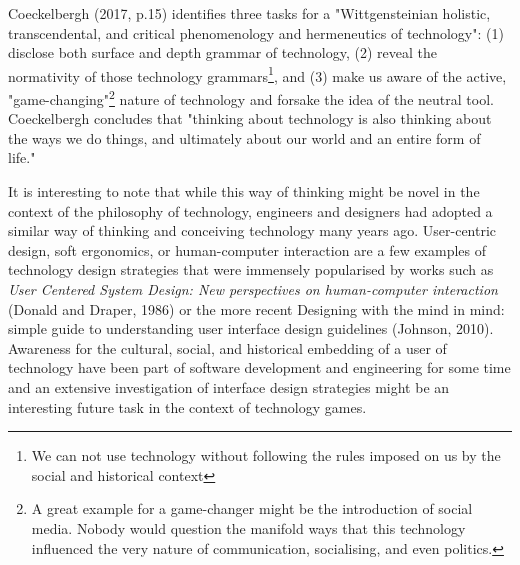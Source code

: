 Coeckelbergh (2017, p.15) identifies three tasks for a "Wittgensteinian holistic, transcendental, and critical phenomenology and hermeneutics of technology": (1) disclose both surface and depth grammar of technology, (2) reveal the normativity of those technology grammars\footnote{We can not use technology without following the rules imposed on us by the social and historical context}, and (3) make us aware of the active, "game-changing"\footnote{A great example for a game-changer might be the introduction of social media. Nobody would question the manifold ways that this technology influenced the very nature of communication, socialising, and even politics.} nature of technology and forsake the idea of the neutral tool. Coeckelbergh concludes that "thinking about technology is also thinking about the
ways we do things, and ultimately about our world and an entire form of life."

It is interesting to note that while this way of thinking might be novel in the context of the philosophy of technology, engineers and designers had adopted a similar way of thinking and conceiving technology many years ago. User-centric design, soft ergonomics, or human-computer interaction are a few examples of technology design
strategies that were immensely popularised by works such as \textit{User Centered System Design: New perspectives on human-computer interaction} (Donald and Draper, 1986) or the more recent Designing with the mind in mind: simple guide to understanding user interface design guidelines (Johnson, 2010). Awareness for the cultural, social, and historical embedding of a user of technology have been part of software development and engineering for some time and an extensive investigation of interface design strategies might be an interesting future task in the context of technology games.